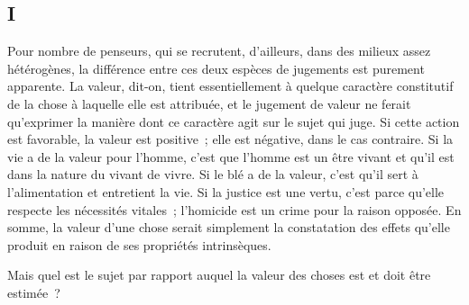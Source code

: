 \documentclass[french,twoside]{book} %
\begin{document}
\subsection[{I}]{I}
\noindent Pour nombre de penseurs, qui se recrutent, d’ailleurs, dans des milieux assez hétérogènes, la différence entre ces deux espèces de jugements est purement apparente. La valeur, dit-on, tient essentiellement à quelque caractère constitutif de la chose à laquelle elle est attribuée, et le jugement de valeur ne ferait qu’exprimer la manière dont ce caractère agit sur le sujet qui juge. Si cette action est favorable, la valeur est positive ; elle est négative, dans le cas contraire. Si la vie a de la valeur pour l’homme, c’est que l’homme est un être vivant et qu’il est dans la nature du vivant de vivre. Si le blé a de la valeur, c’est qu’il sert à l’alimentation et entretient la vie. Si la justice est une vertu, c’est parce qu’elle respecte les nécessités vitales ; l’homicide est un crime pour la raison opposée. En somme, la valeur d’une chose serait simplement la constatation des effets qu’elle produit en raison de ses propriétés intrinsèques.\par
Mais quel est le sujet par rapport auquel la valeur des choses est et doit être estimée ?\par
\end{document}
